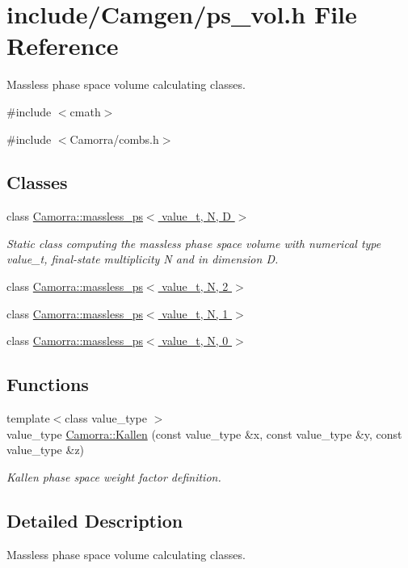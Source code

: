 \hypertarget{a00586}{
\section{include/Camgen/ps\_\-vol.h File Reference}
\label{a00586}
}


Massless phase space volume calculating classes.  


{\ttfamily \#include $<$cmath$>$}\par
{\ttfamily \#include $<$Camorra/combs.h$>$}\par
\subsection*{Classes}
\begin{DoxyCompactItemize}
\item 
class \hyperlink{a00325}{Camorra::massless\_\-ps$<$ value\_\-t, N, D $>$}
\begin{DoxyCompactList}\small\item\em Static class computing the massless phase space volume with numerical type value\_\-t, final-\/state multiplicity N and in dimension D. \end{DoxyCompactList}\item 
class \hyperlink{a00328}{Camorra::massless\_\-ps$<$ value\_\-t, N, 2 $>$}
\item 
class \hyperlink{a00327}{Camorra::massless\_\-ps$<$ value\_\-t, N, 1 $>$}
\item 
class \hyperlink{a00326}{Camorra::massless\_\-ps$<$ value\_\-t, N, 0 $>$}
\end{DoxyCompactItemize}
\subsection*{Functions}
\begin{DoxyCompactItemize}
\item 
\hypertarget{a00800_afe383962b5cdcd4eeb55816e3cc4c8dd}{
{\footnotesize template$<$class value\_\-type $>$ }\\value\_\-type \hyperlink{a00800_afe383962b5cdcd4eeb55816e3cc4c8dd}{Camorra::Kallen} (const value\_\-type \&x, const value\_\-type \&y, const value\_\-type \&z)}
\label{a00800_afe383962b5cdcd4eeb55816e3cc4c8dd}

\begin{DoxyCompactList}\small\item\em Kallen phase space weight factor definition. \end{DoxyCompactList}\end{DoxyCompactItemize}


\subsection{Detailed Description}
Massless phase space volume calculating classes. 